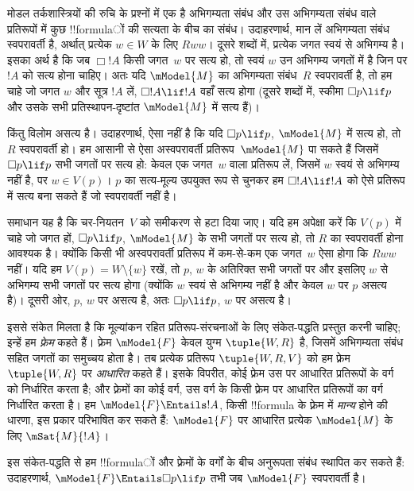 \documentclass[../../../include/open-logic-section]{subfiles}
\begin{document}


मोडल तर्कशास्त्रियों की रुचि के प्रश्नों में एक है अभिगम्यता संबंध और उस
अभिगम्यता संबंध वाले प्रतिरूपों में कुछ !!{formula}ों की सत्यता के बीच का
संबंध। उदाहरणार्थ, मान लें अभिगम्यता संबंध स्वपरावर्ती है, अर्थात् प्रत्येक
$w \in W$ के लिए $Rww$। दूसरे शब्दों में, प्रत्येक जगत स्वयं से अभिगम्य है।
इसका अर्थ है कि जब $\Box !A$ किसी जगत~$w$ पर सत्य हो, तो स्वयं $w$ उन
अभिगम्य जगतों में है जिन पर $!A$ को सत्य होना चाहिए। अतः यदि
$\mModel{M}$ का अभिगम्यता संबंध~$R$ स्वपरावर्ती है, तो हम चाहे जो जगत $w$
और सूत्र $!A$ लें, $\Box !A \lif !A$ वहाँ सत्य होगा (दूसरे शब्दों में,
स्कीमा $\Box p \lif p$ और उसके सभी प्रतिस्थापन-दृष्टांत $\mModel{M}$ में
सत्य हैं)।

किंतु विलोम असत्य है। उदाहरणार्थ, ऐसा नहीं है कि यदि $\Box p \lif p$,
$\mModel{M}$ में सत्य हो, तो $R$ स्वपरावर्ती हो। हम आसानी से ऐसा अस्वपरावर्ती
प्रतिरूप~$\mModel{M}$ पा सकते हैं जिसमें $\Box p \lif p$ सभी जगतों पर सत्य
हो: केवल एक जगत~$w$ वाला प्रतिरूप लें, जिसमें $w$ स्वयं से अभिगम्य नहीं है,
पर $w \in V(p)$। $p$ का सत्य-मूल्य उपयुक्त रूप से चुनकर हम
$\Box !A \lif !A$ को ऐसे प्रतिरूप में सत्य बना सकते हैं जो स्वपरावर्ती नहीं
है।

समाधान यह है कि चर-नियतन~$V$ को समीकरण से हटा दिया जाए। यदि हम अपेक्षा करें
कि $V(p)$ में चाहे जो जगत हों, $\Box p \lif p$, $\mModel{M}$ के सभी जगतों
पर सत्य हो, तो $R$ का स्वपरावर्ती होना आवश्यक है। क्योंकि किसी भी
अस्वपरावर्ती प्रतिरूप में कम-से-कम एक जगत~$w$ ऐसा होगा कि $Rww$ नहीं। यदि हम
$V(p) = W \setminus \{w\}$ रखें, तो $p$, $w$ के अतिरिक्त सभी जगतों पर और
इसलिए $w$ से अभिगम्य सभी जगतों पर सत्य होगा (क्योंकि $w$ स्वयं से अभिगम्य
नहीं है और केवल $w$ पर $p$ असत्य है)। दूसरी ओर, $p$, $w$ पर असत्य है, अतः
$\Box p \lif p$, $w$ पर असत्य है।

इससे संकेत मिलता है कि मूल्यांकन रहित प्रतिरूप-संरचनाओं के लिए संकेत-पद्धति
प्रस्तुत करनी चाहिए; इन्हें हम \emph{फ़्रेम} कहते हैं। फ़्रेम
$\mModel{F}$ केवल युग्म $\tuple{W, R}$ है, जिसमें अभिगम्यता संबंध सहित जगतों
का समुच्चय होता है। तब प्रत्येक प्रतिरूप $\tuple{W, R, V}$ को हम फ़्रेम
$\tuple{W, R}$ पर \emph{आधारित} कहते हैं। इसके विपरीत, कोई फ़्रेम उस पर
आधारित प्रतिरूपों के वर्ग को निर्धारित करता है; और फ़्रेमों का कोई वर्ग,
उस वर्ग के किसी फ़्रेम पर आधारित प्रतिरूपों का वर्ग निर्धारित करता है। हम
$\mModel{F} \Entails !A$, किसी !!{formula} के फ़्रेम में \emph{मान्य} होने की
धारणा, इस प्रकार परिभाषित कर सकते हैं: $\mModel{F}$ पर आधारित प्रत्येक
$\mModel{M}$ के लिए $\mSat{M}{!A}$।

इस संकेत-पद्धति से हम !!{formula}ों और फ़्रेमों के वर्गों के बीच अनुरूपता संबंध
स्थापित कर सकते हैं: उदाहरणार्थ, $\mModel{F} \Entails \Box p \lif p$ तभी
जब $\mModel{F}$ स्वपरावर्ती है।
\end{document}
